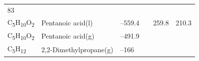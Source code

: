 \documentclass[
]{book}
\theoremstyle{definition}
\theoremstyle{definition}
\theoremstyle{definition}
\theoremstyle{remark}
\begin{document}
\begin{longtable}[]{@{}llllll@{}}
\begin{minipage}[t]{0.14\columnwidth}
83\strut
\end{minipage}\tabularnewline
\begin{minipage}[t]{0.07\columnwidth}\raggedright
C\textsubscript{5}H\textsubscript{10}O\textsubscript{2}\strut
\end{minipage} & \begin{minipage}[t]{0.17\columnwidth}\raggedright
Pentanoic acid(l)\strut
\end{minipage} & \begin{minipage}[t]{0.15\columnwidth}\raggedright
--559.4\strut
\end{minipage} & \begin{minipage}[t]{0.15\columnwidth}\raggedright
\strut
\end{minipage} & \begin{minipage}[t]{0.14\columnwidth}\raggedright
259.8\strut
\end{minipage} & \begin{minipage}[t]{0.14\columnwidth}\raggedright
210.3\strut
\end{minipage}\tabularnewline
\begin{minipage}[t]{0.07\columnwidth}\raggedright
C\textsubscript{5}H\textsubscript{10}O\textsubscript{2}\strut
\end{minipage} & \begin{minipage}[t]{0.17\columnwidth}\raggedright
Pentanoic acid(g)\strut
\end{minipage} & \begin{minipage}[t]{0.15\columnwidth}\raggedright
--491.9\strut
\end{minipage} & \begin{minipage}[t]{0.15\columnwidth}\raggedright
\strut
\end{minipage} & \begin{minipage}[t]{0.14\columnwidth}\raggedright
\strut
\end{minipage} & \begin{minipage}[t]{0.14\columnwidth}\raggedright
\strut
\end{minipage}\tabularnewline
\begin{minipage}[t]{0.07\columnwidth}\raggedright
C\textsubscript{5}H\textsubscript{12}\strut
\end{minipage} & \begin{minipage}[t]{0.17\columnwidth}\raggedright
2,2-Dimethylpropane(g)\strut
\end{minipage} & \begin{minipage}[t]{0.15\columnwidth}\raggedright
--166\strut
\end{minipage} & \begin{minipage}[t]{0.15\columnwidth}\raggedright

\end{minipage}
\end{longtable}
\end{document}
